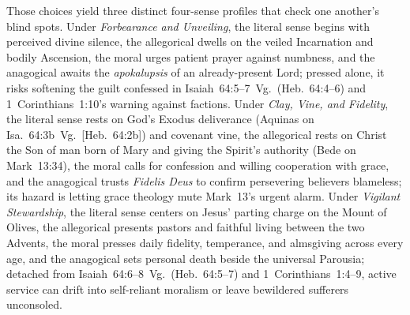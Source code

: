 Those choices yield three distinct four-sense profiles that check one another's blind spots. Under \emph{Forbearance and Unveiling}, the literal sense begins with perceived divine silence, the allegorical dwells on the veiled Incarnation and bodily Ascension, the moral urges patient prayer against numbness, and the anagogical awaits the \emph{apokalupsis} of an already-present Lord; pressed alone, it risks softening the guilt confessed in Isaiah~64:5--7~Vg.\ (Heb.~64:4--6) and 1~Corinthians~1:10's warning against factions. Under \emph{Clay, Vine, and Fidelity}, the literal sense rests on God's Exodus deliverance (Aquinas on Isa.~64:3b~Vg.\ [Heb.~64:2b]) and covenant vine, the allegorical rests on Christ the Son of man born of Mary and giving the Spirit's authority (Bede on Mark~13:34), the moral calls for confession and willing cooperation with grace, and the anagogical trusts \emph{Fidelis Deus} to confirm persevering believers blameless; its hazard is letting grace theology mute Mark~13's urgent alarm. Under \emph{Vigilant Stewardship}, the literal sense centers on Jesus' parting charge on the Mount of Olives, the allegorical presents pastors and faithful living between the two Advents, the moral presses daily fidelity, temperance, and almsgiving across every age, and the anagogical sets personal death beside the universal Parousia; detached from Isaiah~64:6--8~Vg.\ (Heb.~64:5--7) and 1~Corinthians~1:4--9, active service can drift into self-reliant moralism or leave bewildered sufferers unconsoled.

